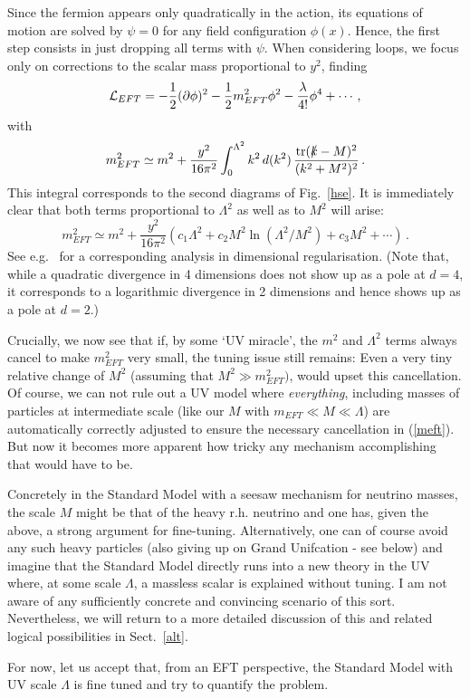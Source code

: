 \documentclass[12pt]{article}
\newcommand{\be}{\begin{equation}}
\newcommand{\ee}{\end{equation}}
\numberwithin{equation}{section}
\begin{document}
Since the fermion appears only quadratically in the action, its equations of motion are solved by $\psi=0$ for any field configuration $\phi(x)$. Hence, the first step consists in just dropping all terms with $\psi$. When considering loops, we focus only on corrections to the scalar mass proportional to $y^2$, finding
\be
{\cal L}_{EFT}=-\frac{1}{2}(\partial\phi)^2-\frac{1}{2}m_{EFT}^2\phi^2-
\frac{\lambda}{4!}\phi^4+\cdots\,,
\ee
with
\be
m^2_{EFT}\simeq m^2+\frac{y^2}{16\pi^2}\int_0^{\Lambda^2}k^2\,d(k^2)\,\frac{\mbox{tr}(\slashed{k}-M)^2}{(k^2+M^2)^2}\,.
\ee
This integral corresponds to the second diagrams of Fig.~\ref{hse}. It is immediately clear that both terms proportional to $\Lambda^2$ as well as to $M^2$ will arise:
\be
m^2_{EFT}\simeq m^2+\frac{y^2}{16\pi^2}\left(c_1\Lambda^2+c_2M^2\ln(\Lambda^2/M^2)+c_3M^2+\cdots\right)\,.\label{meft}
\ee
See e.g.~\cite{Srednicki:2007qs} for a corresponding analysis in dimensional regularisation. (Note that, while a quadratic divergence in 4 dimensions does not show up as a pole at $d=4$, it corresponds to a logarithmic divergence in 2 dimensions and hence shows up as a pole at $d=2$.)

Crucially, we now see that if, by some `UV miracle', the $m^2$ and $\Lambda^2$ terms always cancel to make $m_{EFT}^2$ very small, the tuning issue still remains: Even a very tiny relative change of $M^2$ (assuming that $M^2\gg m_{EFT}^2)$, would upset this cancellation. Of course, we can not rule out a UV model where {\it everything}, including masses of particles at intermediate scale (like our $M$ with $m_{EFT}\ll M\ll \Lambda$) are automatically correctly adjusted to ensure the necessary cancellation in (\ref{meft}). But now it becomes more apparent how tricky any mechanism accomplishing that would have to be. 

Concretely in the Standard Model with a seesaw mechanism for neutrino masses, the scale $M$ might be that of the heavy r.h. neutrino and one has, given the above, a strong argument for fine-tuning. Alternatively, one can of course avoid any such heavy particles (also giving up on Grand Unifcation - see below) and imagine that the Standard Model directly runs into a new theory in the UV where, at some scale $\Lambda$, a massless scalar is explained without tuning. I am not aware of any sufficiently concrete and convincing scenario of this sort. Nevertheless, we will return to a more detailed discussion of this and related logical possibilities in Sect.~\ref{alt}.

For now, let us accept that, from an EFT perspective, the Standard Model with UV scale $\Lambda$ is fine tuned and try to quantify the problem. 
\end{document}
